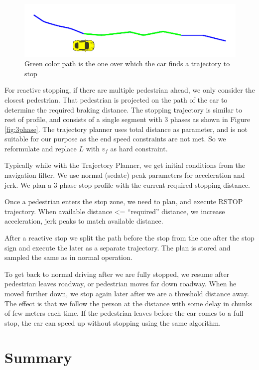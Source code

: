 \documentclass[letterpaper, 10 pt, conference]{ieeeconf}  %
\begin{document}
\begin{figure}[thpb]
  \centering
  \includegraphics[width=1.0\columnwidth]{graphics/RSTOP_path_truncation.png}
  \caption{Green color path is the one over which the car finds a trajectory to stop}
  \label{fig:pathtostop}
\end{figure}

For reactive stopping, if there are multiple pedestrian ahead, we only consider the
closest pedestrian. That pedestrian is projected on the path of the car to determine the
required braking distance. The stopping trajectory is similar to rest of profile,
and consists of a single segment with 3 phases as shown in Figure \ref{fig:3phase}. 
The trajectory planner uses total distance as parameter, and is not suitable for
our purpose as the end speed constraints are not met. So we reformulate and 
replace $L$ with $v_f$ as hard constraint.

Typically while with the Trajectory Planner, we get initial conditions from the
navigation filter. We use normal (sedate) peak parameters for acceleration
and jerk. We plan a 3 phase stop profile with the current required stopping distance.

Once a pedestrian enters the stop zone, we need to plan, and execute RSTOP trajectory.
When available distance <= “required” distance, we increase acceleration, jerk peaks to
match available distance.

After a reactive stop we split the path before the stop from the one after the stop
sign and execute the later as a separate trajectory. The plan is stored and sampled 
the same as in normal operation.

To get back to normal driving after we are fully stopped, we resume
after pedestrian leaves roadway, or pedestrian moves far down roadway.
When he moved further down, we stop again later after we are a threshold
distance away. The effect is that we follow the person at the distance with some 
delay in chunks of few meters each time. If the pedestrian leaves before 
the car comes to a full stop, the car can speed up without stopping using the 
same algorithm.


\section{Summary} \label{sec:summary}
\end{document}
